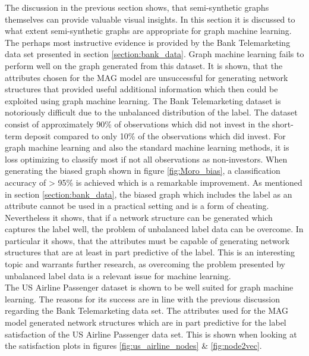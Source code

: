   The discussion in the previous section shows, that semi-synthetic graphs
  themselves can provide valuable visual insights. In this section it is
  discussed to what extent semi-synthetic graphs are appropriate for graph
  machine learning. The perhaps most instructive evidence is provided by the Bank
  Telemarketing data set presented in section \ref{section:bank_data}. Graph
  machine learning fails to perform well on the graph generated from this
  dataset. It is shown, that the attributes chosen for the MAG model are
  unsuccessful for generating network structures that provided useful additional
  information which then could be exploited using graph machine learning. The 
  Bank Telemarketing dataset is notoriously difficult due to the unbalanced
  distribution of the label. The dataset consist of approximately 90\% of
  observations which did not invest in the short-term deposit compared to only 
  10\% of the observations which did invest. For graph machine learning and
  also the standard machine learning methods, it is loss optimizing to
  classify most if not all observations as non-investors. When generating the
  biased graph shown in figure \ref{fig:Moro_bias}, a classification accuracy
  of > 95\% is achieved which is a remarkable improvement. As mentioned in 
  section \ref{section:bank_data}, the biased graph which includes the label
  as an attribute cannot be used in a practical setting and is a form of
  cheating. Nevertheless it shows, that if a network structure can be generated
  which captures the label well, the problem of unbalanced label data can be
  overcome. In particular it shows, that the attributes must be capable of
  generating network structures that are at least in part predictive of the
  label. This is an interesting topic and warrants further research, as
  overcoming the problem presented by unbalanced label data is a relevant issue
  for machine learning. \\

  \noindent The US Airline Passenger dataset is shown to be well suited for 
  graph machine learning. The reasons for its success are in line with the 
  previous discussion regarding the Bank Telemarketing data set. The attributes 
  used for the MAG model generated network structures which are in part 
  predictive for the label satisfaction of the US Airline Passenger data set. 
  This is shown when looking at the satisfaction plots in figures 
  \ref{fig:us_airline_nodes} \& \ref{fig:node2vec}. \\ 

